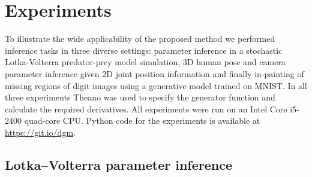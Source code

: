 \section{Experiments}\label{sec:experiments}

To illustrate the wide applicability of the proposed method we performed inference tasks in three diverse settings: parameter inference in a stochastic Lotka-Volterra predator-prey model simulation, 3D human pose and camera parameter inference given 2D joint position information and finally in-painting of missing regions of digit images using a generative model trained on MNIST. In all three experiments Theano \citep{theano2016theano} was used to specify the generator function and calculate the required derivatives. All experiments were run on an Intel Core i5-2400 quad-core CPU. Python code for the experiments is available at \url{https://git.io/dgm}.

\subsection{Lotka--Volterra parameter inference}

